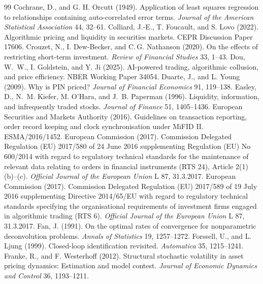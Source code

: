 \documentclass[12pt]{article}
\theoremstyle{definition}
\theoremstyle{remark}
\begin{document}
\begin{thebibliography}{99}
 Cochrane, D., and G. H. Orcutt (1949). Application of least squares regression to relationships containing auto-correlated error terms. \emph{Journal of the American Statistical Association} 44, 32--61.
 Colliard, J.-E., T. Foucault, and S. Lovo (2022). Algorithmic pricing and liquidity in securities markets. CEPR Discussion Paper 17606.
 Crouzet, N., I. Dew-Becker, and C.\,G. Nathanson (2020). On the effects of restricting short-term investment. \emph{Review of Financial Studies} 33, 1--43.
 Dou, W.~W., I. Goldstein, and Y. Ji (2025). AI-powered trading, algorithmic collusion, and price efficiency. NBER Working Paper 34054.
 Duarte, J., and L. Young (2009). Why is PIN priced? \emph{Journal of Financial Economics} 91, 119--138.
 Easley, D., N.~M. Kiefer, M. O'Hara, and J.~B. Paperman (1996). Liquidity, information, and infrequently traded stocks. \emph{Journal of Finance} 51, 1405--1436.
 European Securities and Markets Authority (2016). Guidelines on transaction reporting, order record keeping and clock synchronisation under MiFID II. ESMA/2016/1452.
 European Commission (2017). Commission Delegated Regulation (EU) 2017/580 of 24 June 2016 supplementing Regulation (EU) No 600/2014 with regard to regulatory technical standards for the maintenance of relevant data relating to orders in financial instruments (RTS 24), Article 2(1)(b)--(c). \emph{Official Journal of the European Union} L 87, 31.3.2017.
 European Commission (2017). Commission Delegated Regulation (EU) 2017/589 of 19 July 2016 supplementing Directive 2014/65/EU with regard to regulatory technical standards specifying the organisational requirements of investment firms engaged in algorithmic trading (RTS 6). \emph{Official Journal of the European Union} L 87, 31.3.2017.
 Fan, J. (1991). On the optimal rates of convergence for nonparametric deconvolution problems. \emph{Annals of Statistics} 19, 1257--1272.
 Forssell, U., and L. Ljung (1999). Closed-loop identification revisited. \emph{Automatica} 35, 1215--1241.
 Franke, R., and F. Westerhoff (2012). Structural stochastic volatility in asset pricing dynamics: Estimation and model contest. \emph{Journal of Economic Dynamics and Control} 36, 1193--1211.

\end{thebibliography}
\end{document}
